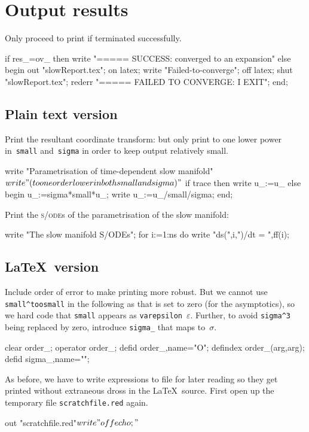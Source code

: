 \documentclass[11pt,a5paper]{article}
\def\sde{\textsc{s/ode}}
\begin{document}
\section{Output results}

Only proceed to print if terminated successfully.
\begin{reduce}
if res_=ov_ 
  then write "===== SUCCESS: converged to an expansion"
  else begin
      out "slowReport.tex"; on latex;
      write "Failed-to-converge"; 
      off latex; shut "slowReport.tex";
      rederr "===== FAILED TO CONVERGE: I EXIT";
  end;
\end{reduce}


\subsection{Plain text version}

Print the resultant coordinate transform: but only print to
one lower power in~\verb|small| and~\verb|sigma| in order to
keep output relatively small.
\begin{reduce}
write "Parametrisation of time-dependent slow manifold"$
write "(to one order lower in both small and sigma)"$
if trace then write u_:=u_ 
else begin u_:=sigma*small*u_; 
     write u_:=u_/small/sigma; end;
\end{reduce}

Print the \sde{}s of the parametrisation of the slow manifold:
\begin{reduce}
write "The slow manifold S/ODEs";
for i:=1:ns do write "ds(",i,")/dt = ",ff(i);
\end{reduce}



\subsection{\LaTeX\ version}

Include order of error to make printing more robust. But we
cannot use \verb|small^toosmall| in the following as that is
set to zero (for the asymptotics), so we hard code that
\verb|small| appears as \verb|varepsilon|~\(\varepsilon\). 
Further, to avoid \verb|sigma^3| being replaced by zero,
introduce \verb|sigma_| that maps to~\(\sigma\).
\begin{reduce}
clear order_;  operator order_;
defid order_,name="O";
defindex order_(arg,arg);
defid sigma_,name="\sigma";
\end{reduce}


As before, we have to write expressions to file for later
reading so they get printed without extraneous dross in the
\LaTeX\ source. First open up the temporary file
\verb|scratchfile.red| again.
\begin{reduce}
out "scratchfile.red"$
write "off echo;"$ %
\end{reduce}
\end{document}
